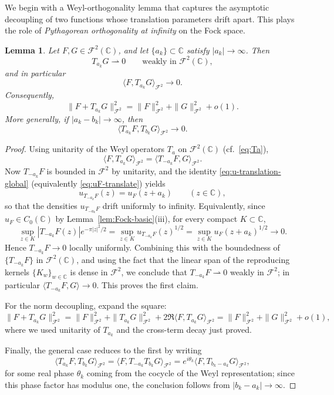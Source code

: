 \documentclass[a4paper,11pt,reqno]{amsart}
\numberwithin{equation}{section}
\theoremstyle{plain} %
\newtheorem{lemma}{Lemma}[section]
\theoremstyle{definition} %
\theoremstyle{remark}
\newcommand{\C}{\mathbb{C}}
\begin{document}
We begin with a Weyl-orthogonality lemma that captures the asymptotic
decoupling of two functions whose translation parameters drift apart. This
plays the role of \emph{Pythagorean orthogonality at infinity} on the Fock
space.

\begin{lemma}\label{lem:weyl-orthogonality-global}
Let \(F,G\in \mathcal F^2(\C)\), and let \(\{a_k\}\subset \C\) satisfy
\(|a_k|\to \infty\). Then
\[
T_{a_k}G \rightharpoonup 0
\qquad\text{weakly in }\mathcal F^2(\C),
\]
and in particular
\[
\langle F,T_{a_k}G\rangle_{\mathcal F^2}\to 0.
\]
Consequently,
\[
\|F+T_{a_k}G\|_{\mathcal F^2}^2
=
\|F\|_{\mathcal F^2}^2+\|G\|_{\mathcal F^2}^2+o(1).
\]
More generally, if \(|a_k-b_k|\to\infty\), then
\[
\langle T_{a_k}F,T_{b_k}G\rangle_{\mathcal F^2}\to 0.
\]
\end{lemma}

\begin{proof}
Using unitarity of the Weyl operators \(T_a\) on \(\mathcal F^2(\C)\) (cf.\
\eqref{eq:Ta}),
\[
\langle F,T_{a_k}G\rangle_{\mathcal F^2}
=
\langle T_{-a_k}F,G\rangle_{\mathcal F^2}.
\]
Now \(T_{-a_k}F\) is bounded in \(\mathcal F^2\) by unitarity, and the
identity \eqref{eq:u-translation-global} (equivalently
\eqref{eq:uF-translate}) yields
\[
u_{T_{-a_k}F}(z)=u_F(z+a_k)\qquad (z\in\C),
\]
so that the densities \(u_{T_{-a_k}F}\) drift uniformly to infinity.
Equivalently, since \(u_F\in C_0(\C)\) by Lemma~\ref{lem:Fock-basic}(iii), for
every compact \(K\subset \C\),
\[
\sup_{z\in K}|T_{-a_k}F(z)|e^{-\pi |z|^2/2}
=
\sup_{z\in K}u_{T_{-a_k}F}(z)^{1/2}
=
\sup_{z\in K}u_F(z+a_k)^{1/2}\to 0.
\]
Hence \(T_{-a_k}F\to 0\) locally uniformly. Combining this with the
boundedness of \(\{T_{-a_k}F\}\) in \(\mathcal F^2(\C)\), and using the fact
that the linear span of the reproducing kernels \(\{K_w\}_{w\in\C}\) is dense
in \(\mathcal F^2\), we conclude that \(T_{-a_k}F\rightharpoonup 0\) weakly in
\(\mathcal F^2\); in particular \(\langle T_{-a_k}F,G\rangle\to 0\). This
proves the first claim.

For the norm decoupling, expand the square:
\[
\|F+T_{a_k}G\|_{\mathcal F^2}^2
=
\|F\|_{\mathcal F^2}^2+\|T_{a_k}G\|_{\mathcal F^2}^2
+2\Re\langle F,T_{a_k}G\rangle_{\mathcal F^2}
=
\|F\|_{\mathcal F^2}^2+\|G\|_{\mathcal F^2}^2+o(1),
\]
where we used unitarity of \(T_{a_k}\) and the cross-term decay just proved.

Finally, the general case reduces to the first by writing
\[
\langle T_{a_k}F,T_{b_k}G\rangle_{\mathcal F^2}
=
\langle F,T_{-a_k}T_{b_k}G\rangle_{\mathcal F^2}
=
e^{i\theta_k}\langle F,T_{b_k-a_k}G\rangle_{\mathcal F^2},
\]
for some real phase \(\theta_k\) coming from the cocycle of the Weyl
representation; since this phase factor has modulus one, the conclusion
follows from \(|b_k-a_k|\to\infty\).
\end{proof}
\end{document}
